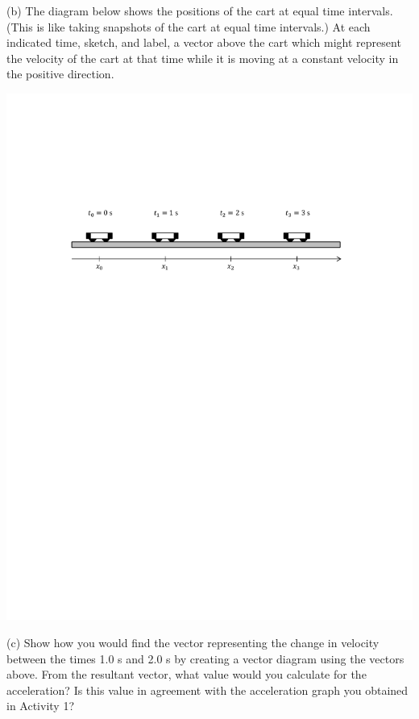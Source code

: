 (b) The diagram below shows the positions of the cart at equal time intervals.
(This is like taking snapshots of the cart at equal time intervals.) At each
indicated time, sketch, and label, a vector above the cart which might represent the velocity
of the cart at that time while it is moving at a constant velocity in the positive direction.

{\par\centering \includegraphics{changing/carts_const_v.pdf} \par}

(c) Show how you would find the vector representing the change in velocity
between the times 1.0 s and 2.0 s by creating a vector diagram using the 
vectors above. From the resultant vector, what value would you calculate for 
the acceleration? Is this value in agreement with the acceleration graph you obtained in Activity 1?
\answerspace{20mm}

